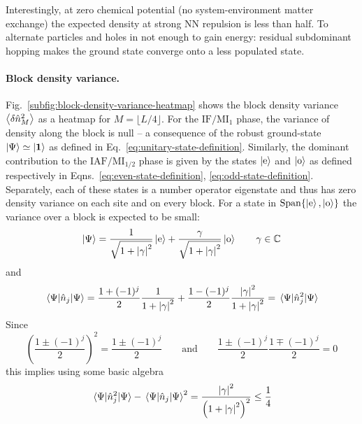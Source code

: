 Interestingly, at zero chemical potential (no system-environment matter exchange) the expected density at strong NN repulsion is less than half. To alternate particles and holes in not enough to gain energy: residual subdominant hopping makes the ground state converge onto a less populated state.

\paragraph{Block density variance.} Fig.~\ref{subfig:block-density-variance-heatmap} shows the block density variance $\ev{ \delta \hat n_{M}^2 }$ as a heatmap for $M = \lfloor L/4 \rfloor$. For the $\mathrm{IF}/\mathrm{MI}_1$ phase, the variance of density along the block is null -- a consequence of the robust ground-state $\ket{\Psi} \simeq \ket{\bm{1}}$ as defined in Eq.~\eqref{eq:unitary-state-definition}.
Similarly, the dominant contribution to the $\mathrm{IAF}/\mathrm{MI}_{1/2}$ phase is given by the states $\ket{\mathrm{e}}$ and $\ket{\mathrm{o}}$ as defined respectively in Eqns.~\eqref{eq:even-state-definition}, \eqref{eq:odd-state-definition}. Separately, each of these states is a number operator eigenstate and thus has zero density variance on each site and on every block. For a state in $\mathrm{Span}\lbrace \ket{\mathrm{e}}, \ket{\mathrm{o}} \rbrace$ the variance over a block is expected to be small:
\[
	\ket{\Psi} = \frac{1}{\sqrt{1 + \abs{\gamma}^2}} \ket{\mathrm{e}} + \frac{\gamma}{\sqrt{1 + \abs{\gamma}^2}} \ket{\mathrm{o}}
	\qquad
	\gamma \in \mathbb{C}
\]
and
\[
	\mel{\Psi}{\hat n_j}{\Psi} = \frac{1+(-1)^j}{2} \frac{1}{1 + \abs{\gamma}^2} + \frac{1-(-1)^j}{2} \frac{\abs{\gamma}^2}{1 + \abs{\gamma}^2} = 		\mel{\Psi}{\hat n_j^2 }{\Psi}
\]
Since
\[
	\left(
		\frac{1\pm(-1)^j}{2}
	\right)^2 = \frac{1\pm(-1)^j}{2}
	\qquad\text{and}\qquad
	\frac{1\pm(-1)^j}{2} \frac{1\mp(-1)^j}{2} = 0
\]
this implies using some basic algebra
\[
	\mel{\Psi}{\hat n_j^2 }{\Psi} - \mel{\Psi}{\hat n_j}{\Psi}^2 = \frac{\abs{\gamma}^2}{\left(1 + \abs{\gamma}^2\right)^2}  \le \frac{1}{4}
\]
